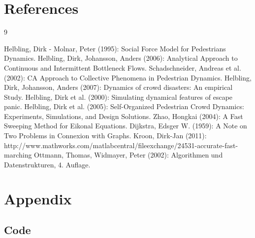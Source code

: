 \documentclass[11pt]{article}
\begin{document}

\section{References}

\begin{thebibliography} {9}
	
	 Helbling, Dirk - Molnar, Peter (1995): Social Force Model for Pedestrians Dynamics.
	 Helbling, Dirk, Johansson, Anders (2006): Analytical Approach to Continuous and Intermittent Bottleneck Flows.
	 Schadschneider, Andreas et al. (2002): CA Approach to Collective Phenomena in Pedestrian Dynamics.	
	 Helbling, Dirk, Johansson, Anders (2007): Dynamics of crowd disasters: An empirical Study.
	 Helbling, Dirk et al. (2000): Simulating dynamical features of escape panic.
	 Helbling, Dirk et al. (2005): Self-Organized Pedestrian Crowd Dynamics: Experiments, Simulations, and Design Solutions.
	 Zhao, Hongkai (2004): A Fast Sweeping Method for Eikonal Equations.
	 Dijkstra, Edsger W. (1959): A Note on Two Problems in Connexion with Graphs.
	 Kroon, Dirk-Jan (2011): http://www.mathworks.com/matlabcentral/fileexchange/24531-accurate-fast-marching
	 Ottmann, Thomas, Widmayer, Peter (2002): Algorithmen und Datenstrukturen, 4. Auflage.

\end{thebibliography}


\section{Appendix}

\subsection{Code}

\lstset{language=Matlab,breaklines=true}

















\end{document}
